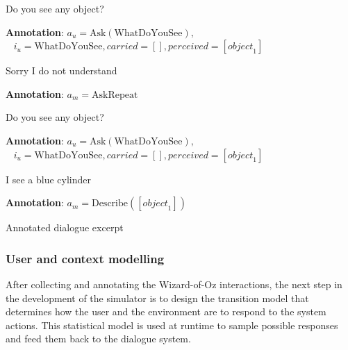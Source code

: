 \begin{Transcript}[p]
\begin{dialogue}
 Do you see any object? \\[1mm] 
\begin{footnotesize}\textbf{Annotation}: $a_u\!=\!\mathrm{Ask(WhatDoYouSee)},$\\ $\phantom{1}$ \hspace{16mm}$ i_u\!=\!\mathrm{WhatDoYouSee},\mathit{carried}\!=\![],\mathit{perceived}\!=\![\mathit{object}_1]$ \end{footnotesize} \vspace{3mm}
 Sorry I do not understand \\[1mm]
\begin{footnotesize}\textbf{Annotation}: $a_m\!=\!\mathrm{AskRepeat}$ \end{footnotesize}\vspace{3mm}
 Do you see any object? \\[1mm]
\begin{footnotesize}\textbf{Annotation}: $a_u\!=\!\mathrm{Ask(WhatDoYouSee)}, $ \\ $\phantom{1}$ \hspace{16mm}$i_u\!=\! \mathrm{WhatDoYouSee}, \mathit{carried}\!=\![],\mathit{perceived}\!=\![\mathit{object}_1]$\end{footnotesize} \vspace{3mm}
 I see a blue cylinder \\[1mm]
\begin{footnotesize}\textbf{Annotation}: $a_m\!=\!\mathrm{Describe}([\mathit{object}_1])$ \end{footnotesize} \vspace{1mm}
\end{dialogue}
\caption{Annotated dialogue excerpt}
\end{Transcript}


\subsubsection*{User and context modelling}

After collecting and annotating the Wizard-of-Oz interactions, the next step in the development of the simulator is to design the transition model that determines how the user and the environment are to respond to the system actions. This statistical model is used at runtime to sample possible responses and feed them back to the dialogue system. 

